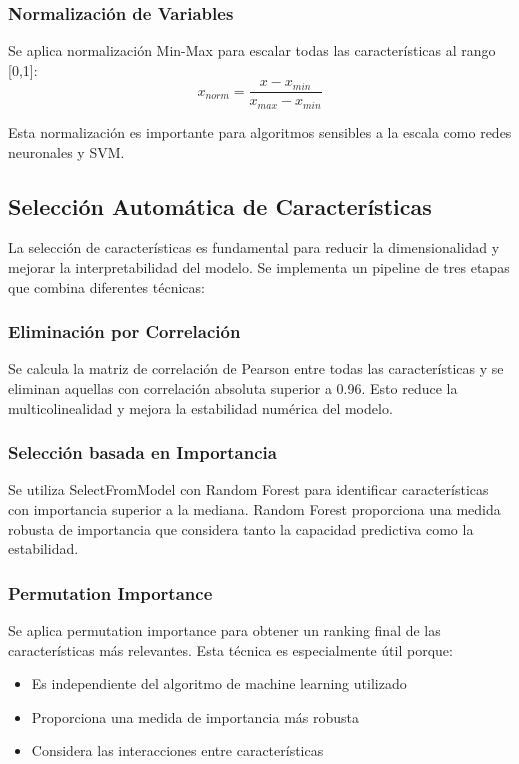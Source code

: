 \documentclass[conference]{IEEEtran}
\begin{document}
	\subsubsection{Normalización de Variables}
	Se aplica normalización Min-Max para escalar todas las características al rango [0,1]:
	\begin{equation}
		x_{norm} = \frac{x - x_{min}}{x_{max} - x_{min}}
	\end{equation}
	
	Esta normalización es importante para algoritmos sensibles a la escala como redes neuronales y SVM.
	
	\subsection{Selección Automática de Características}
	La selección de características es fundamental para reducir la dimensionalidad y mejorar la interpretabilidad del modelo. Se implementa un pipeline de tres etapas que combina diferentes técnicas:
	
	\subsubsection{Eliminación por Correlación}
	Se calcula la matriz de correlación de Pearson entre todas las características y se eliminan aquellas con correlación absoluta superior a 0.96. Esto reduce la multicolinealidad y mejora la estabilidad numérica del modelo.
	
	\subsubsection{Selección basada en Importancia}
	Se utiliza SelectFromModel con Random Forest para identificar características con importancia superior a la mediana. Random Forest proporciona una medida robusta de importancia que considera tanto la capacidad predictiva como la estabilidad.
	
	\subsubsection{Permutation Importance}
	Se aplica permutation importance para obtener un ranking final de las características más relevantes. Esta técnica es especialmente útil porque:
	\begin{itemize}
		\item Es independiente del algoritmo de machine learning utilizado
		\item Proporciona una medida de importancia más robusta
		\item Considera las interacciones entre características
	\end{itemize}
	
\end{document}

